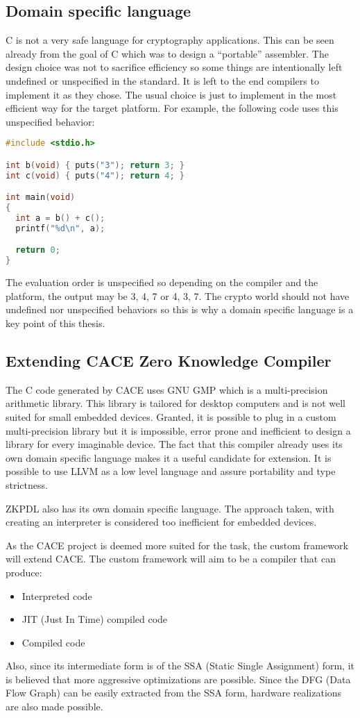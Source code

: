 \subsection{Domain specific language}

C is not a very safe language for cryptography applications. This
can be seen already from the goal of C which was to design a
``portable'' assembler. The design choice was not to sacrifice
efficiency so some things are intentionally left undefined or
unspecified in the standard. It is left to the end compilers to
implement it as they chose. The usual choice is just to implement in
the most efficient way for the target platform. For example, the
following code uses this unspecified behavior:

\begin{lstlisting}[language=C]
#include <stdio.h>

int b(void) { puts("3"); return 3; }
int c(void) { puts("4"); return 4; }

int main(void)
{
  int a = b() + c();
  printf("%d\n", a);

  return 0;
}
\end{lstlisting}

The evaluation order is unspecified so depending on the compiler and
the platform, the output may be 3, 4, 7 or 4, 3, 7. The crypto world
should not have undefined nor unspecified behaviors so this is why a
domain specific language is a key point of this thesis.

\subsection{Extending CACE Zero Knowledge Compiler}

The C code generated by CACE uses GNU GMP which is a multi-precision
arithmetic library. This library is tailored for desktop computers and
is not well suited for small embedded devices. Granted, it is possible
to plug in a custom multi-precision library but it is impossible,
error prone and inefficient to design a library for every imaginable
device. The fact that this compiler already uses its own domain
specific language makes it a useful candidate for extension. It is
possible to use LLVM as a low level language and assure portability
and type strictness.

ZKPDL also has its own domain specific language. The approach taken,
with creating an interpreter is considered too inefficient for
embedded devices.

As the CACE project is deemed more suited for the task, the custom
framework will extend CACE. The custom framework will aim to be a
compiler that can produce:
\begin{itemize}
\item Interpreted code
\item JIT (Just In Time) compiled code
\item Compiled code
\end{itemize}
Also, since its intermediate form is of the SSA (Static Single
Assignment) form, it is believed that more aggressive optimizations
are possible. Since the DFG (Data Flow Graph) can be easily extracted
from the SSA form, hardware realizations are also made possible.

